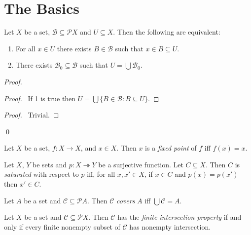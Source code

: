 \section{The Basics}

\begin{lm}
  \label{lm:set_theory:union_of_subsets}
  Let $X$ be a set, $\mathcal{B} \subseteq \mathcal{P} X$ and $U \subseteq
  X$. Then the following are equivalent:
  \begin{enumerate}
    \item For all $x \in U$ there exists $B \in \mathcal{B}$ such that $x \in
    B \subseteq U$.
    \item There exists $\mathcal{B}_0 \subseteq \mathcal{B}$ such that $U =
    \bigcup \mathcal{B}_0$.
  \end{enumerate}
\end{lm}

\begin{proof}
  \pf
  \begin{proof}
    \pf\ If 1 is true then $U = \bigcup \{ B \in \mathcal{B} : B \subseteq U
    \}$.
  \end{proof}
  \begin{proof}
    \pf\ Trivial.
  \end{proof}
  \qed
\end{proof}

\begin{df}
  Let $X$ be a set, $f : X \rightarrow X$, and $x \in X$. Then $x$ is a
  \emph{fixed point} of $f$ iff $f(x) = x$.
\end{df}

\begin{df}[Saturated]
  Let $X$, $Y$ be sets and $p : X \twoheadrightarrow Y$ be a surjective
  function. Let $C \subseteq X$. Then $C$ is \emph{saturated} with respect to
  $p$ iff, for all $x, x' \in X$, if $x \in C$ and $p(x) = p(x')$ then $x'
  \in
  C$.
\end{df}

\begin{df}[Cover]
  Let $A$ be a set and $\mathcal{C} \subseteq \mathcal{P}
  A$. Then $\mathcal{C}$ \emph{covers} $A$ iff $\bigcup \mathcal{C} = A$.
\end{df}

\begin{df}
  Let $X$ be a set and $\mathcal{C} \subseteq \mathcal{P} X$. Then
  $\mathcal{C}$ has the \emph{finite intersection property} if and only if
  every finite nonempty subset of $\mathcal{C}$ has nonempty intersection.
\end{df}

